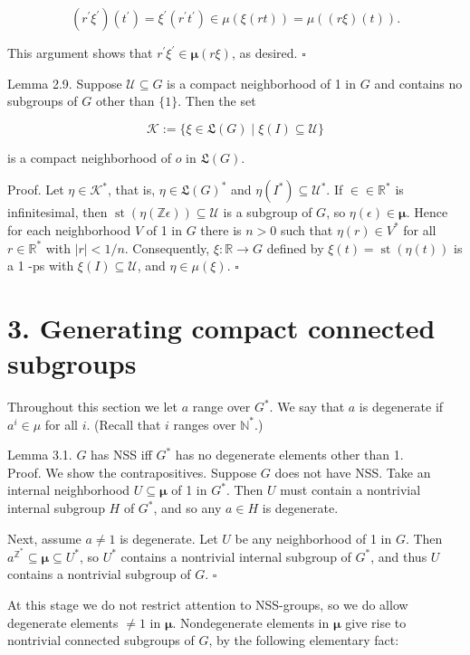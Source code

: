 \documentclass[10pt]{article}
\begin{document}
$$
\left(r^{\prime} \xi^{\prime}\right)\left(t^{\prime}\right)=\xi^{\prime}\left(r^{\prime} t^{\prime}\right) \in \mu(\xi(r t))=\mu((r \xi)(t)) .
$$

This argument shows that $r^{\prime} \xi^{\prime} \in \boldsymbol{\mu}(r \xi)$, as desired. \(\square\)

Lemma 2.9. Suppose $\mathcal{U} \subseteq G$ is a compact neighborhood of 1 in $G$ and contains no subgroups of $G$ other than $\{1\}$. Then the set

$$
\mathcal{K}:=\{\xi \in \mathfrak{L}(G) \mid \xi(I) \subseteq \mathcal{U}\}
$$

is a compact neighborhood of $o$ in $\mathfrak{L}(G)$.

Proof. Let $\eta \in \mathcal{K}^{*}$, that is, $\eta \in \mathfrak{L}(G)^{*}$ and $\eta\left(I^{*}\right) \subseteq \mathcal{U}^{*}$. If $\in \in \mathbb{R}^{*}$ is infinitesimal, then $\operatorname{st}(\eta(\mathbb{Z} \epsilon)) \subseteq \mathcal{U}$ is a subgroup of $G$, so $\eta(\epsilon) \in \boldsymbol{\mu}$. Hence for each neighborhood $V$ of 1 in $G$ there is $n>0$ such that $\eta(r) \in V^{*}$ for all $r \in \mathbb{R}^{*}$ with $|r|<1 / n$. Consequently, $\xi: \mathbb{R} \rightarrow G$ defined by $\xi(t)=\operatorname{st}(\eta(t))$ is a 1 -ps with $\xi(I) \subseteq \mathcal{U}$, and $\eta \in \mu(\xi)$. \(\square\)

\section*{3. Generating compact connected subgroups}
Throughout this section we let $a$ range over $G^{*}$. We say that $a$ is degenerate if $a^{i} \in \mu$ for all $i$. (Recall that $i$ ranges over $\mathbb{N}^{*}$.)

Lemma 3.1. $G$ has NSS iff $G^{*}$ has no degenerate elements other than 1.\\
Proof. We show the contrapositives. Suppose $G$ does not have NSS. Take an internal neighborhood $U \subseteq \boldsymbol{\mu}$ of 1 in $G^{*}$. Then $U$ must contain a nontrivial internal subgroup $H$ of $G^{*}$, and so any $a \in H$ is degenerate.

Next, assume $a \neq 1$ is degenerate. Let $U$ be any neighborhood of 1 in $G$. Then $a^{\mathbb{Z}^{*}} \subseteq \boldsymbol{\mu} \subseteq U^{*}$, so $U^{*}$ contains a nontrivial internal subgroup of $G^{*}$, and thus $U$ contains a nontrivial subgroup of $G$. \(\square\)

At this stage we do not restrict attention to NSS-groups, so we do allow degenerate elements $\neq 1$ in $\boldsymbol{\mu}$. Nondegenerate elements in $\boldsymbol{\mu}$ give rise to nontrivial connected subgroups of $G$, by the following elementary fact:
\end{document}

